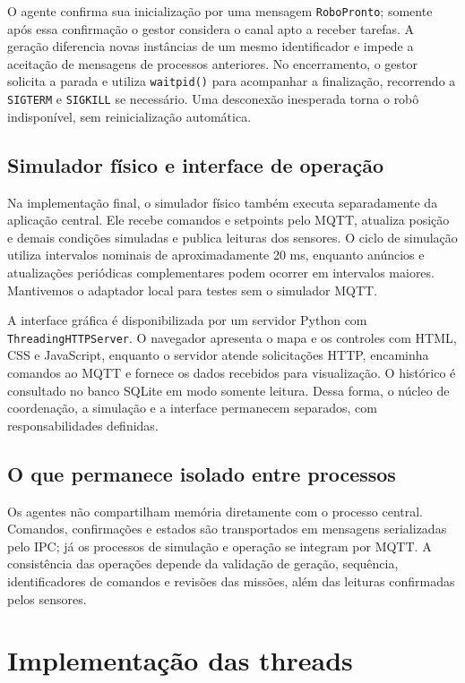 \documentclass[12pt,a4paper]{article}
\newcommand{\code}[1]{\mbox{\texttt{#1}}}
\begin{document}
O agente confirma sua inicialização por uma mensagem \code{RoboPronto}; somente
após essa confirmação o gestor considera o canal apto a receber tarefas. A
geração diferencia novas instâncias de um mesmo identificador e impede a
aceitação de mensagens de processos anteriores. No encerramento, o gestor
solicita a parada e utiliza \code{waitpid()} para acompanhar a finalização,
recorrendo a \code{SIGTERM} e \code{SIGKILL} se necessário. Uma desconexão
inesperada torna o robô indisponível, sem reinicialização automática.

\subsection{Simulador físico e interface de operação}
Na implementação final, o simulador físico também executa separadamente da
aplicação central. Ele recebe comandos e setpoints pelo MQTT, atualiza posição
e demais condições simuladas e publica leituras dos sensores. O ciclo de
simulação utiliza intervalos nominais de aproximadamente 20 ms, enquanto
anúncios e atualizações periódicas complementares podem ocorrer em intervalos
maiores. Mantivemos o adaptador local para testes sem o simulador MQTT.

A interface gráfica é disponibilizada por um servidor Python com
\code{ThreadingHTTPServer}. O navegador apresenta o mapa e os controles com
HTML, CSS e JavaScript, enquanto o servidor atende solicitações HTTP, encaminha
comandos ao MQTT e fornece os dados recebidos para visualização. O histórico é
consultado no banco SQLite em modo somente leitura. Dessa forma, o núcleo de
coordenação, a simulação e a interface permanecem separados, com
responsabilidades definidas.

\subsection{O que permanece isolado entre processos}
Os agentes não compartilham memória diretamente com o processo central.
Comandos, confirmações e estados são transportados em mensagens serializadas
pelo IPC; já os processos de simulação e operação se integram por MQTT. A
consistência das operações depende da validação de geração, sequência,
identificadores de comandos e revisões das missões, além das leituras
confirmadas pelos sensores.

\section{Implementação das threads}
\end{document}
